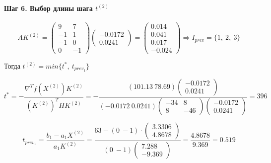 \paragraph{Шаг 6. Выбор длины шага $t^{(2)}$}

\begin{equation*}
	A K^{(2)} = \begin{pmatrix}
		9 & 7
		\\
		-1 & 1
		\\
		-1 & 0
		\\
		0 & -1
	\end{pmatrix}
	\begin{pmatrix} 
		-0.0172
		\\ 
		0.0241
	\end{pmatrix}
	=
	\begin{pmatrix}
		0.014 \\ 0.041 \\ 0.017\\ -0.024
	\end{pmatrix}
	\Rightarrow I_{prev} = \{1,\ 2,\ 3\}
\end{equation*}

Тогда $t^{(2)} = min\{t^*,\ t_{prev_1}\}$

\begin{equation*}
	t^* = -\frac{\nabla^T f(X^{(2)}) K^{(2)}}{(K^{(2)})^T H K^{(2)}} = -\frac{(101.13\  78.69) \begin{pmatrix} -0.0172 \\ 0.0241 \end{pmatrix}}{(-0.0172\ 0.0241) \begin{pmatrix} -34 & 8 \\ 8 & -46 \end{pmatrix} \begin{pmatrix} -0.0172 \\ 0.0241 \end{pmatrix}} = 396
\end{equation*}

\begin{equation*}
	t_{prev_1} = \frac{b_1 - a_1 X^{(2)}}{a_1 K^{(2)}} = \frac{63 - (0\ -1) \cdot \begin{pmatrix} 3.3306 \\ 4.8678 \end{pmatrix}}{(0\ -1) \begin{pmatrix} 7.288 \\ -9.369 \end{pmatrix}} = \frac{4.8678}{9.369} = 0.519
\end{equation*}

